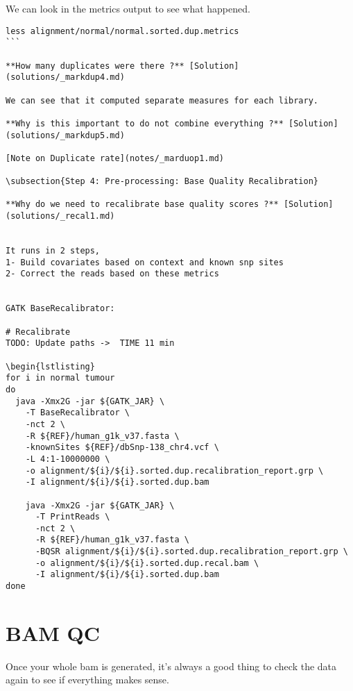 We can look in the metrics output to see what happened.

\begin{lstlisting}
less alignment/normal/normal.sorted.dup.metrics
```

**How many duplicates were there ?** [Solution](solutions/_markdup4.md)

We can see that it computed separate measures for each library.
 
**Why is this important to do not combine everything ?** [Solution](solutions/_markdup5.md)

[Note on Duplicate rate](notes/_marduop1.md)

\subsection{Step 4: Pre-processing: Base Quality Recalibration}

**Why do we need to recalibrate base quality scores ?** [Solution](solutions/_recal1.md)


It runs in 2 steps, 
1- Build covariates based on context and known snp sites
2- Correct the reads based on these metrics


GATK BaseRecalibrator:

# Recalibrate
TODO: Update paths ->  TIME 11 min

\begin{lstlisting}
for i in normal tumour
do
  java -Xmx2G -jar ${GATK_JAR} \
    -T BaseRecalibrator \
    -nct 2 \
    -R ${REF}/human_g1k_v37.fasta \
    -knownSites ${REF}/dbSnp-138_chr4.vcf \
    -L 4:1-10000000 \
    -o alignment/${i}/${i}.sorted.dup.recalibration_report.grp \
    -I alignment/${i}/${i}.sorted.dup.bam

    java -Xmx2G -jar ${GATK_JAR} \
      -T PrintReads \
      -nct 2 \
      -R ${REF}/human_g1k_v37.fasta \
      -BQSR alignment/${i}/${i}.sorted.dup.recalibration_report.grp \
      -o alignment/${i}/${i}.sorted.dup.recal.bam \
      -I alignment/${i}/${i}.sorted.dup.bam
done
\end{lstlisting}

\section{BAM QC}

Once your whole bam is generated, it's always a good thing to check the data again to see if everything makes sense.


